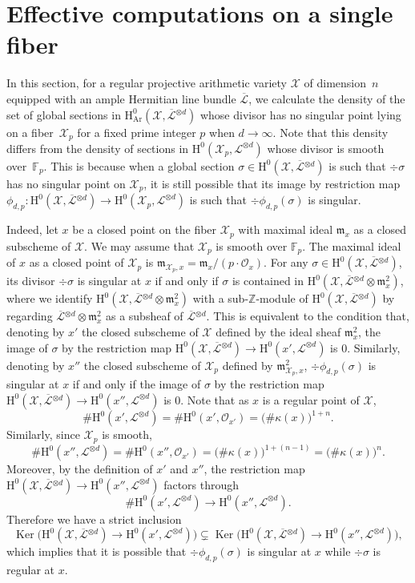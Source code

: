 \documentclass[11pt]{article}
\numberwithin{equation}{section}
\let\ra\rightarrow
\theoremstyle{plain}
\theoremstyle{definition}
\newcommand{\ho}{\mathrm{H}}
\newcommand{\X}{\mathcal{X}}
\newcommand{\Li}{\overline{\mathcal{L}}{}}
\newcommand{\li}{\mathcal{L}}
\newcommand{\Z}{\mathbb{Z}}
\newcommand{\F}{\mathbb{F}}
\DeclareMathOperator{\Ker}{Ker}
\begin{document}
\section{Effective computations on a single fiber}\label{effective}

In this section, for a regular projective arithmetic variety $\X$ of dimension~$n$ equipped with an ample Hermitian line bundle $\Li$, we calculate the density of the set of global sections in $\ho^0_{\mathrm{Ar}}(\X, \Li^{\otimes d})$ whose divisor has no singular point lying on a fiber~$\X_p$ for a fixed prime integer $p$ when $d\to \infty$. Note that this density differs from the density of sections in $\ho^0(\X_p, \li^{\otimes d})$ whose divisor is smooth over~$\F_p$. This is because when a global section $\sigma \in \ho^0(\X, \Li^{\otimes d})$ is such that $\div \sigma$ has no singular point on $\X_p$, it is still possible that its image by restriction map $\phi_{d,p}: \ho^0(\X, \Li^{\otimes d})\to \ho^0(\X_p, \li^{\otimes d})$ is such that $\div \phi_{d,p}(\sigma)$ is singular.

Indeed, let $x$ be a closed point on the fiber $\X_p$ with maximal ideal $\mathfrak{m}_x$ as a closed subscheme of $\X$. We may assume that $\X_p$ is smooth over $\F_p$. The maximal ideal of $x$ as a closed point of $\X_p$ is $\mathfrak{m}_{\X_p,x}=\mathfrak{m}_x/(p\cdot\mathcal{O}_x)$. For any $\sigma\in \ho^0(\X,\Li^{\otimes d})$, its divisor $\div \sigma$ is singular at $x$ if and only if $\sigma$ is contained in $\ho^0(\X, \Li^{\otimes d}\otimes \mathfrak{m}_{x}^2)$, where we identify $\ho^0(\X, \Li^{\otimes d}\otimes \mathfrak{m}_{x}^2)$ with a sub-$\Z$-module of $\ho^0(\X,\Li^{\otimes d})$ by regarding $\Li^{\otimes d}\otimes \mathfrak{m}_{x}^2$ as a subsheaf of $\Li^{\otimes d}$. This is equivalent to the condition that, denoting by $x'$ the closed subscheme of $\X$ defined by the ideal sheaf $\mathfrak{m}_x^2$, the image of $\sigma$ by the restriction map $\ho^0(\X, \Li^{\otimes d})\to \ho^0(x', \li^{\otimes d})$ is $0$. Similarly, denoting by $x''$ the closed subscheme of $\X_p$ defined by $\mathfrak{m}_{\X_p,x}^2$, $\div \phi_{d,p}(\sigma)$ is singular at $x$ if and only if the image of $\sigma$ by the restriction map $\ho^0(\X, \Li^{\otimes d})\to \ho^0(x'', \li^{\otimes d})$ is $0$. Note that as $x$ is a regular point of $\X$,
\[
\#\ho^0(x', \li^{\otimes d})=\#\ho^0(x', \mathcal{O}_{x'})=\big(\#\kappa(x)\big)^{1+n}.
\]
Similarly, since $\X_p$ is smooth,
\[
\#\ho^0(x'', \li^{\otimes d})=\#\ho^0(x'', \mathcal{O}_{x'})=\big(\#\kappa(x)\big)^{1+(n-1)}=\big(\#\kappa(x)\big)^n.
\]
Moreover, by the definition of $x'$ and $x''$, the restriction map $\ho^0(\X, \Li^{\otimes d})\to \ho^0(x'', \li^{\otimes d})$ factors through
\[
\#\ho^0(x', \li^{\otimes d})\to \ho^0(x'', \li^{\otimes d}).
\]
Therefore we have a strict inclusion
\[
\Ker\bigl(\ho^0(\X, \Li^{\otimes d})\ra \ho^0(x', \li^{\otimes d}) \bigr) \subsetneq \Ker\bigl(\ho^0(\X, \Li^{\otimes d})\ra \ho^0(x'', \li^{\otimes d})\bigr),
\]
which implies that it is possible that $\div \phi_{d,p}(\sigma)$ is singular at $x$ while $\div \sigma$ is regular at $x$.
\end{document}

